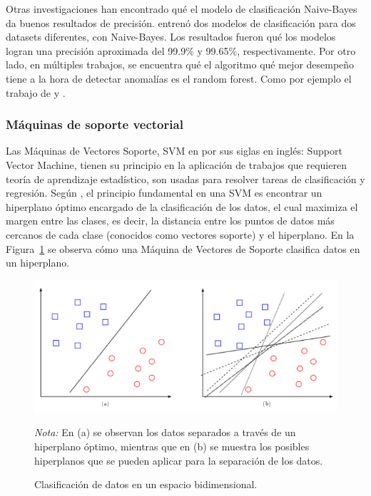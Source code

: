 \documentclass[11pt,a4paper,spanish]{book}
\numberwithin{equation}{chapter}
\numberwithin{figure}{chapter}
\begin{document}
Otras investigaciones han encontrado qué el modelo de clasificación Naive-Bayes da 
buenos resultados de precisión. \cite{chen2016xgboost} entrenó dos modelos de 
clasificación para dos datasets diferentes, con Naive-Bayes. Los resultados fueron qué 
los modelos logran una precisión aproximada del 99.9\% y 99.65\%, respectivamente. 
Por otro lado, en múltiples trabajos, se encuentra qué el algoritmo qué mejor desempeño 
tiene a la hora de detectar anomalías es el random forest. Como por ejemplo el trabajo 
de \cite{sharma2022predictive} y \cite{yu2025tkeo}.


\subsubsection{Máquinas de soporte vectorial}

Las Máquinas de Vectores Soporte, SVM en por sus siglas en inglés: Support Vector 
Machine, tienen su principio en la aplicación de trabajos que requieren teoría de 
aprendizaje estadístico, son usadas para resolver tareas de clasificación y regresión. 
Según \cite{amat2017maquinas}, el principio fundamental en una SVM es encontrar un 
hiperplano óptimo encargado de la clasificación de los datos, el cual maximiza el 
margen entre las clases, es decir, la distancia entre los puntos de datos más cercanos 
de cada clase (conocidos como vectores soporte) y el hiperplano. En la 
Figura~\ref{fig:figSVM} se observa cómo una Máquina de Vectores de Soporte clasifica 
datos en un hiperplano. 


\begin{figure}[h]
    \caption{Clasificación de datos en un espacio bidimensional. \protect\cite{suarez2014svm}}
    \centering
    \includegraphics[width=1.0\textwidth]{media/svm-dm.png}
    \label{fig:figSVM}
	\parbox{\textwidth}{\footnotesize \textit{Nota:} En (a) se observan 
    los datos separados a través de un hiperplano óptimo, mientras que en (b) se muestra 
    los posibles hiperplanos que se pueden aplicar para la separación de los datos.}
\end{figure}
\end{document}
